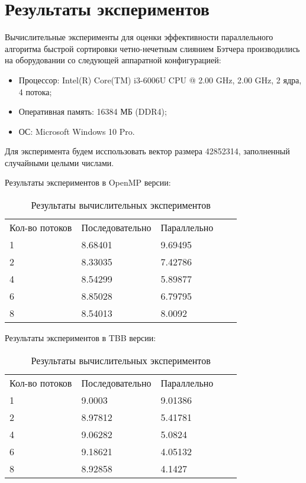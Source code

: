 \documentclass{report}
\begin{document}
\newpage

\section*{Результаты экспериментов}
Вычислительные эксперименты для оценки эффективности параллельного алгоритма быстрой сортировки четно-нечетным слиянием Бэтчера производились на оборудовании со следующей аппаратной конфигурацией:

\begin{itemize}
\item Процессор: Intel(R) Core(TM) i3-6006U CPU @ 2.00 GHz, 2.00 GHz, 2 ядра, 4 потока;
\item Оперативная память: 16384 МБ (DDR4);
\item ОС: Microsoft Windows 10 Pro. 
\end{itemize}

\par Для эксперимента будем исспользовать вектор размера 42852314, заполненный случайными целыми числами. 
\par Результаты экспериментов в OpenMP версии:
\begin{table}[!h]
\caption{Результаты вычислительных экспериментов}
\centering
\begin{tabular}{lllll}
Кол-во потоков  & Последовательно & Параллельно \\
1      & 8.68401         & 9.69495  \\
2     & 8.33035         & 7.42786  \\
4     & 8.54299        & 5.89877 \\
6     & 8.85028        & 6.79795 \\
8     & 8.54013        & 8.0092

\end{tabular}
\end{table}

\par Результаты экспериментов в TBB версии:
\begin{table}[!h]
\caption{Результаты вычислительных экспериментов}
\centering
\begin{tabular}{lllll}
Кол-во потоков  & Последовательно & Параллельно \\
1      & 9.0003         & 9.01386  \\
2     & 8.97812         & 5.41781  \\
4     & 9.06282        & 5.0824 \\
6     &9.18621         & 4.05132 \\
8     & 8.92858        & 4.1427 \\

\end{tabular}
\end{table}
\end{document}
